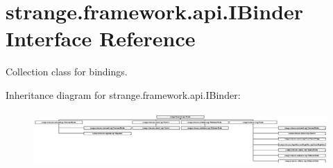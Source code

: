 \hypertarget{interfacestrange_1_1framework_1_1api_1_1_i_binder}{\section{strange.\-framework.\-api.\-I\-Binder Interface Reference}
\label{interfacestrange_1_1framework_1_1api_1_1_i_binder}
}


Collection class for bindings.  


Inheritance diagram for strange.\-framework.\-api.\-I\-Binder\-:\begin{figure}[H]
\begin{center}
\leavevmode
\includegraphics[height=2.074074cm]{interfacestrange_1_1framework_1_1api_1_1_i_binder}
\end{center}
\end{figure}
